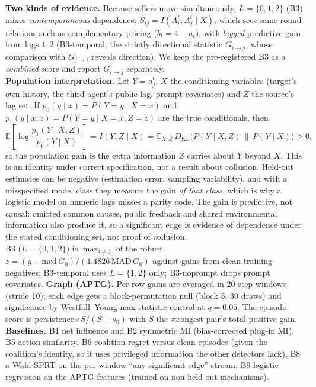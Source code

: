 \documentclass[11pt]{article}
\begin{document}
\textbf{Two kinds of evidence.} Because sellers move simultaneously, $L{=}\{0,1,2\}$ (B3) mixes \emph{contemporaneous} dependence, $S_{ij}=I(A_i^t;A_j^t\mid X)$, which sees same-round relations such as complementary pricing ($b_t=4-a_t$), with \emph{lagged} predictive gain from lags $1,2$ (B3-temporal, the strictly directional statistic $G_{i\to j}$, whose comparison with $G_{j\to i}$ reveals direction). We keep the pre-registered B3 as a \emph{combined} score and report $G_{i\to j}$ separately.\\[2pt]\textbf{Population interpretation.} Let $Y=a_j^t$, $X$ the conditioning variables (target's own history, the third agent's public lag, prompt covariates) and $Z$ the source's lag set. If $p_0(y\mid x)=P(Y{=}y\mid X{=}x)$ and $p_1(y\mid x,z)=P(Y{=}y\mid X{=}x,Z{=}z)$ are the true conditionals, then\[ \mathbb{E}\!\left[\log\frac{p_1(Y\mid X,Z)}{p_0(Y\mid X)}\right]=I(Y;Z\mid X)=\mathbb{E}_{X,Z}\,D_{\mathrm{KL}}\!\big(P(Y\mid X,Z)\,\|\,P(Y\mid X)\big)\ge 0, \]so the population gain is the extra information $Z$ carries about $Y$ beyond $X$. This is an identity under correct specification, not a result about collusion. Held-out estimates can be negative (estimation error, sampling variability), and with a misspecified model class they measure the gain \emph{of that class}, which is why a logistic model on numeric lags misses a parity code. The gain is predictive, not causal: omitted common causes, public feedback and shared environmental information also produce it, so a significant edge is evidence of dependence under the stated conditioning set, not proof of collusion.\\[2pt]B3 ($L{=}\{0,1,2\}$) is $\max_{i\neq j}$ of the robust $z=(g-\mathrm{med}\,G_0)/(1.4826\,\mathrm{MAD}\,G_0)$ against gains from clean training negatives; B3-temporal uses $L{=}\{1,2\}$ only; B3-noprompt drops prompt covariates.
\textbf{Graph (APTG).} Per-row gains are averaged in 20-step windows (stride 10); each edge gets a block-permutation null (block 5, 30 draws) and significance by Westfall--Young max-statistic control at $q{=}0.05$. The episode score is persistence$\times S/(S{+}s_0)$ with $S$ the strongest pair's total positive gain.
\textbf{Baselines.} B1 net influence and B2 symmetric MI (bias-corrected plug-in MI), B5 action similarity, B6 coalition regret versus clean episodes (given the coalition's identity, so it uses privileged information the other detectors lack), B8 a Wald SPRT on the per-window ``any significant edge'' stream, B9 logistic regression on the APTG features (trained on non-held-out mechanisms).
\end{document}
